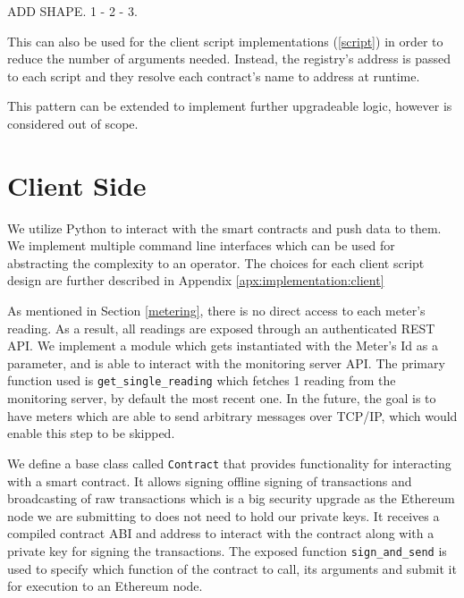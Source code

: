 ADD SHAPE. 1 - 2 - 3.

This can also be used for the client script implementations (\ref{script}) in order to reduce the number of arguments needed. Instead, the registry's address is passed to each script and they resolve each contract's name to address at runtime.

This pattern can be extended to implement further upgradeable logic, however is considered out of scope.


\section{Client Side}

We utilize Python to interact with the smart contracts and push data to them. We implement multiple command line interfaces which can be used for abstracting the complexity to an operator. The choices for each client script design are further described in Appendix \ref{apx:implementation:client}


As mentioned in Section \ref{metering}, there is no direct access to each meter's reading. As a result, all readings are exposed through an authenticated REST API. We implement a module which gets instantiated with the Meter's Id as a parameter, and is able to interact with the monitoring server API. The primary function used is \texttt{get\_single\_reading} which fetches 1 reading from the monitoring server, by default the most recent one. In the future, the goal is to have meters which are able to send arbitrary messages over TCP/IP, which would enable this step to be skipped. 

We define a base class called \texttt{Contract} that provides functionality for interacting  with a smart contract. It allows signing offline signing of transactions and broadcasting of raw transactions which is a big security upgrade as the Ethereum node we are submitting to does not need to hold our private keys. It receives a compiled contract ABI and address to interact with the contract along with a private key for signing the transactions. The exposed function \texttt{sign\_and\_send} is used to specify which function of the contract to call, its arguments and submit it for execution to an Ethereum node.

